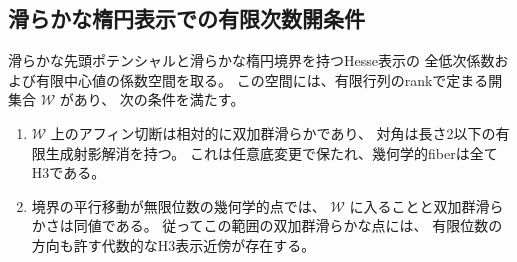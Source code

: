 \subsection{滑らかな楕円表示での有限次数開条件}
\label{subsec:cubic-CY-three-alpha-elliptic-relative}

\begin{theorem}\label{thm:cubic-CY-three-alpha-elliptic-relative-smooth-open}
滑らかな先頭ポテンシャルと滑らかな楕円境界を持つHesse表示の
全低次係数および有限中心値の係数空間を取る。
この空間には、有限行列のrankで定まる開集合 $\mathcal W$ があり、
次の条件を満たす。
\begin{enumerate}
\item $\mathcal W$ 上のアフィン切断は相対的に双加群滑らかであり、
対角は長さ2以下の有限生成射影解消を持つ。
これは任意底変更で保たれ、幾何学的fiberは全てH3である。
\item 境界の平行移動が無限位数の幾何学的点では、
$\mathcal W$ に入ることと双加群滑らかさは同値である。
従ってこの範囲の双加群滑らかな点には、
有限位数の方向も許す代数的なH3表示近傍が存在する。
\end{enumerate}
\end{theorem}

